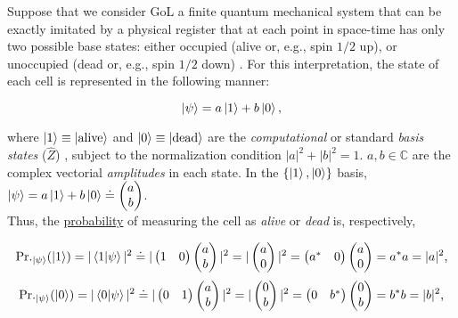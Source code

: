 \documentclass[11pt]{article}
\numberwithin{equation}{section} %
\numberwithin{figure}{section} %
\begin{document}
Suppose that we consider GoL a finite quantum mechanical system that can be exactly imitated by a physical register that at each point in space-time has only two possible base states: either occupied (alive or, e.g., spin $1/2$ up), or unoccupied (dead or, e.g., spin $1/2$ down) \cite[p.~475, l.~27-31]{Feynman}. For this interpretation, the state of each cell is represented in the following manner: \cite[p.~1, Eq.~(1)]{Flitney}

\begin{equation} \label{Eq.1}
\ket{\psi}=a\ket{1}+b\ket{0}\textrm{,}
\end{equation}

where $\ket{1}\equiv\ket{\textrm{alive}}$ and $\ket{0}\equiv\ket{\textrm{dead}}$ are the \emph{computational} or standard \emph{basis states} ($\hat{Z}$) \cite[p.~13, l.~23]{Nielsen}, subject to the normalization condition $|a|^2+|b|^2=1$. $a,b\in\mathbb{C}$ are the complex vectorial \emph{amplitudes} in each state. In the $\{\ket{1},\ket{0}\}$ basis, $\ket{\psi}=a\ket{1}+b\ket{0}\doteq \begin{pmatrix} a \\ b \end{pmatrix}$.\\

Thus, the \uline{probability} \cite[p.~24, Eq.~(1.4.4)]{Sakurai} of measuring the cell as \emph{alive} or \emph{dead} is, respectively,

\begin{equation} \label{Pr._alive}
\textrm{Pr.}_{\ket{\psi}} (\ket{1})=|\braket{1|\psi}|^2\doteq |\begin{pmatrix} 1&0 \end{pmatrix}\begin{pmatrix} a \\ b \end{pmatrix}|^2 = |\begin{pmatrix} a \\ 0 \end{pmatrix}|^2 = \begin{pmatrix} a^*&0 \end{pmatrix}\begin{pmatrix} a \\ 0 \end{pmatrix} = a^*a=|a|^2\textrm{,}
\end{equation}
\begin{equation} \label{Pr._dead}
\textrm{Pr.}_{\ket{\psi}} (\ket{0})=|\braket{0|\psi}|^2\doteq |\begin{pmatrix} 0&1 \end{pmatrix}\begin{pmatrix} a \\ b \end{pmatrix}|^2 = |\begin{pmatrix} 0 \\ b \end{pmatrix}|^2 = \begin{pmatrix} 0&b^* \end{pmatrix}\begin{pmatrix} 0 \\ b \end{pmatrix} = b^*b=|b|^2\textrm{,}
\end{equation}
\end{document}
